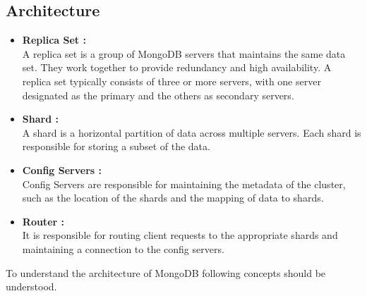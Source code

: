 \documentclass[12pt]{article}
\begin{document}
\subsection{Architecture}
\begin{itemize}
    \item {\bfseries Replica Set : \\}
    A replica set is a group of MongoDB servers that maintains the same data set. They work together to provide redundancy and high availability. A replica set typically consists of three or more servers, with one server designated as the primary and the others as secondary servers.
    \item {\bfseries Shard : \\}
    A shard is a horizontal partition of data across multiple servers. Each shard is responsible for storing a subset of the data.
    \item{\bfseries Config Servers : \\}
    Config Servers are responsible for maintaining the metadata of the cluster, such as the location of the shards and the mapping of data to shards.
    \item {\bfseries Router : \\}
    It is responsible for routing client requests to the appropriate shards and maintaining a connection to the config servers.
\end{itemize}
To understand the architecture of MongoDB following concepts should be understood.
\end{document}
